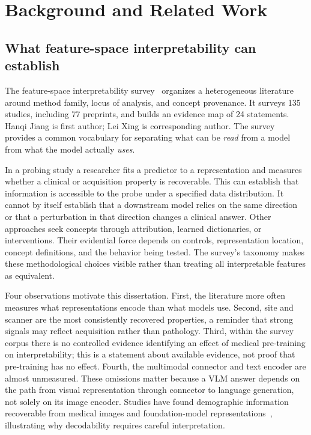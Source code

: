 \section{Background and Related Work}\label{sec:background}
\subsection{What feature-space interpretability can establish}
The feature-space interpretability survey~\citep{fsi} organizes a heterogeneous literature around method family, locus of analysis, and concept provenance. It surveys 135 studies, including 77 preprints, and builds an evidence map of 24 statements. Hanqi Jiang is first author; Lei Xing is corresponding author. The survey provides a common vocabulary for separating what can be \emph{read} from a model from what the model actually \emph{uses}.

In a probing study a researcher fits a predictor to a representation and measures whether a clinical or acquisition property is recoverable. This can establish that information is accessible to the probe under a specified data distribution. It cannot by itself establish that a downstream model relies on the same direction or that a perturbation in that direction changes a clinical answer. Other approaches seek concepts through attribution, learned dictionaries, or interventions. Their evidential force depends on controls, representation location, concept definitions, and the behavior being tested. The survey's taxonomy makes these methodological choices visible rather than treating all interpretable features as equivalent.

Four observations motivate this dissertation. First, the literature more often measures what representations encode than what models use. Second, site and scanner are the most consistently recovered properties, a reminder that strong signals may reflect acquisition rather than pathology. Third, within the survey corpus there is no controlled evidence identifying an effect of medical pre-training on interpretability; this is a statement about available evidence, not proof that pre-training has no effect. Fourth, the multimodal connector and text encoder are almost unmeasured. These omissions matter because a VLM answer depends on the path from visual representation through connector to language generation, not solely on its image encoder. Studies have found demographic information recoverable from medical images and foundation-model representations~\citep{gichoya2022ai,zheng2024demographic}, illustrating why decodability requires careful interpretation.


